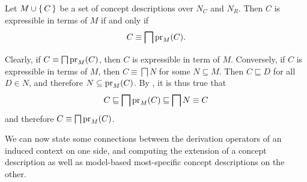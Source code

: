 \begin{Lemma}
  \label{lem:characterizing-expressible-in-terms-of}
  Let $M \cup {\ensuremath{\{\,C\,\}}}$ be a set of concept descriptions over $N_C$ and $N_R$.  Then $C$ is
  expressible in terms of $M$ if and only if
  \begin{equation*}
    C \equiv \bigsqcap \operatorname{pr}_M(C).
  \end{equation*}
\end{Lemma}
\begin{Proof}
  Clearly, if $C \equiv \bigsqcap \operatorname{pr}_M(C)$, then $C$ is expressible in term of $M$.
  Conversely, if $C$ is expressible in terms of $M$, then $C \equiv \bigsqcap N$ for some
  $N \subseteq M$.  Then $C \sqsubseteq D$ for all $D \in N$, and therefore $N \subseteq
  \operatorname{pr}_M(C)$.  By , it is thus true that
  \begin{equation*}
    C \sqsubseteq \bigsqcap \operatorname{pr}_M(C) \sqsubseteq \bigsqcap N \equiv C
  \end{equation*}
  and therefore $C \equiv \bigsqcap \operatorname{pr}_M(C)$.
\end{Proof}

We can now state some connections between the derivation operators of an induced context
on one side, and computing the extension of a concept description as well as model-based
most-specific concept descriptions on the other.

